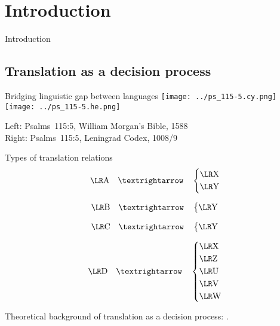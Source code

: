 \setcounter{section}{-1}
\section{Introduction}

\begin{frame}{}
	\begin{center}
		Introduction
	\end{center}
\end{frame}



\subsection{Translation as a decision process}

\begin{frame}{Bridging linguistic gap between languages}
	\texttt{[image: ../ps\_115-5.cy.png]}
	\hfill
	\texttt{[image: ../ps\_115-5.he.png]}

	\vfill

	Left: Psalms~115:5, William Morgan’s Bible, 1588\\
	Right: Psalms~115:5, Leningrad Codex, 1008/9
\end{frame}



\begin{frame}{\hopoint Types of translation relations}
	$$
	\mtext{A} \transto
	\begin{dcases}
		\mtext{X}\\
		\mtext{Y}
	\end{dcases}
	$$

	$$
	\mtext{B} \transto
	\begin{dcases}
		\mtext{Y}
	\end{dcases}
	$$

	$$
	\mtext{C} \transto
	\begin{dcases}
		\mtext{Y}
	\end{dcases}
	$$

	$$
	\mtext{D} \transto
	\begin{dcases}
		\mtext{X}\\
		\mtext{Z}\\
		\mtext{U}\\
		\mtext{V}\\
		\mtext{W}
	\end{dcases}
	$$

	{\footnotesize Theoretical background of translation as a decision process: \cite{levy.j:1967:translation}.}
\end{frame}



